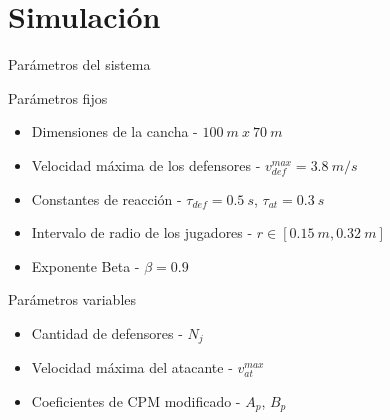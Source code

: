 \section{Simulación}\label{sec:simulacion}
\begin{frame}{Parámetros del sistema}
    \begin{block}{Parámetros fijos}
        \begin{itemize}
            \item Dimensiones de la cancha - \(100\ m\ x\ 70\ m\)
            \item Velocidad máxima de los defensores - \(v_{def}^{max} = 3.8\ m/s\)
            \item Constantes de reacción - \(\tau_{def} = 0.5\ s\), \(\tau_{at} = 0.3\ s\)
            \item Intervalo de radio de los jugadores - \(r \in [0.15\ m, 0.32\ m]\)\
            \item Exponente Beta - \(\beta = 0.9\)
        \end{itemize}
    \end{block}
    \begin{block}{Parámetros variables}
        \begin{itemize}
            \item Cantidad de defensores - \(N_j\)
            \item Velocidad máxima del atacante - \(v_{at}^{max}\)
            \item Coeficientes de CPM modificado - \(A_p\), \(B_p\)
        \end{itemize}
    \end{block}
\end{frame}

